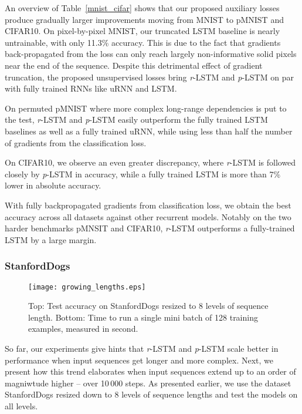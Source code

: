 \documentclass{article}
\newcommand{\rlstm}{{\it r}-LSTM}
\newcommand{\plstm}{{\it p}-LSTM}
\begin{document}
An overview of Table~\ref{mnist_cifar} shows that our proposed auxiliary losses produce gradually larger improvements moving from MNIST to pMNIST and CIFAR10. On pixel-by-pixel MNIST, our truncated LSTM baseline is nearly untrainable, with only 11.3\% accuracy. This is due to the fact that gradients back-propagated from the loss can only reach largely non-informative solid pixels near the end of the sequence. Despite this detrimental effect of gradient truncation, the proposed unsupervised losses bring \rlstm{} and \plstm{} on par with fully trained RNNs like uRNN and LSTM.

On permuted pMNIST where more complex long-range dependencies is put to the test, \rlstm{} and \plstm{} easily outperform the fully trained LSTM baselines as well as a fully trained uRNN, while using less than half the number of gradients from the classification loss.

On CIFAR10, we observe an even greater discrepancy, where \rlstm{} is followed closely by \plstm{} in accuracy, while a fully trained LSTM is more than 7\% lower in absolute accuracy. 

With fully backpropagated gradients from classification loss, we obtain the best accuracy across all datasets against other recurrent models. Notably on the two harder benchmarks pMNSIT and CIFAR10, \rlstm{} outperforms a fully-trained LSTM by a large margin.


\subsubsection{StanfordDogs}



\begin{figure}[tb]
\texttt{[image: growing\_lengths.eps]}
\caption{Top: Test accuracy on StanfordDogs resized to 8 levels of sequence length. Bottom: Time to run a single mini batch of 128 training examples, measured in second.}
\label{fig:growing_lengths}
\end{figure}

So far, our experiments give hints that \rlstm{} and \plstm{} scale better in performance when input sequences get longer and more complex. Next, we present how this trend elaborates when input sequences extend up to an order of magniwtude higher -- over 10\,000 steps. As presented earlier, we use the dataset StanfordDogs resized down to 8 levels of sequence lengths and test the models on all levels.
\end{document}
